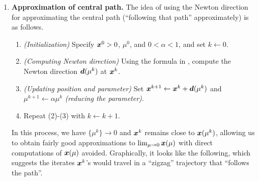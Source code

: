 \begin{enumerate}
\item\label{it:apx-cent-path} \textbf{Approximation of central path.} The idea
of using the Newton direction for approximating the central path (``following
that path'' approximately) is as follows.
\begin{enumerate}[label={(\arabic*)}]
\item \emph{(Initialization)} Specify \(\bm{x}^{0}>0\), \(\mu^{0}\), and
\(0<\alpha<1\),
and set \(k\leftarrow 0\).
\item \emph{(Computing Newton direction)} Using the formula in
, compute the Newton direction
\(\bm{d}(\mu^{k})\) at \(\bm{x}^{k}\).
\item \emph{(Updating position and parameter)} Set \(\bm{x}^{k+1}\leftarrow
\bm{x}^{k}+\bm{d}(\mu^{k})\) and \(\mu^{k+1}\leftarrow \alpha \mu^{k}\)
\emph{(reducing the parameter)}.
\item Repeat (2)-(3) with \(k\leftarrow k+1\).
\end{enumerate}
In this process, we have \(\{\mu^{k}\}\to 0\) and \(\bm{x}^{k}\) remains
close to \(\bm{x}(\mu^{k})\), allowing us to obtain fairly good
approximations to \(\lim_{\mu\to 0}\bm{x}(\mu)\) with direct computations of
\(\bm{x}(\mu)\) avoided. Graphically, it looks like the following,
which suggests the iterates \(\bm{x}^{k}\)'s would travel in a ``zigzag''
trajectory that ``follows the path''.
\begin{center}
\end{center}
\end{enumerate}
